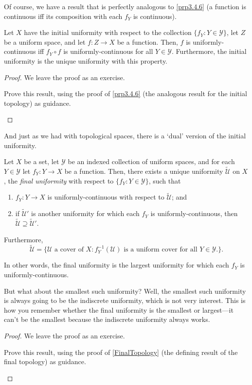 Of course, we have a result that is perfectly analogous to \cref{prp3.4.6} (a function is continuous iff its composition with each $f_Y$ is continuous).
\begin{prp}\label{prp4.2.54}
Let $X$ have the initial uniformity with respect to the collection $\{ f_Y:Y\in \mathcal{Y}\}$, let $Z$ be a uniform space, and let $f:Z\rightarrow X$ be a function.  Then, $f$ is uniformly-continuous iff $f_Y\circ f$ is uniformly-continuous for all $Y\in \mathcal{Y}$.  Furthermore, the initial uniformity is the unique uniformity with this property.
\begin{proof}
We leave the proof as an exercise.
\begin{exr}
Prove this result, using the proof of \cref{prp3.4.6} (the analogous result for the initial topology) as guidance.
\end{exr}
\end{proof}
\end{prp}
And just as we had with topological spaces, there is a `dual' version of the initial uniformity.
\begin{prp}\label{FinalUniformity}
Let $X$ be a set, let $\mathcal{Y}$ be an indexed collection of uniform spaces, and for each $Y\in \mathcal{Y}$ let $f_Y:Y\rightarrow X$ be a function.  Then, there exists a unique uniformity $\widetilde{\mathcal{U}}$ on $X$, the \emph{final uniformity} with respect to $\{ f_Y:Y\in \mathcal{Y}\}$, such that
\begin{enumerate}
\item $f_Y:Y\rightarrow X$ is uniformly-continuous with respect to $\widetilde{\mathcal{U}}$; and
\item if $\widetilde{\mathcal{U}}'$ is another uniformity for which each $f_Y$ is uniformly-continuous, then $\widetilde{\mathcal{U}}\supseteq \widetilde{\mathcal{U}}'$.
\end{enumerate}
Furthermore,
\begin{equation}
\widetilde{\mathcal{U}}=\{ \mathcal{U}\text{ a cover of }X:f_Y^{-1}(\mathcal{U})\text{ is a uniform cover for all }Y\in \mathcal{Y}\text{.}\} .
\end{equation}
\begin{rmk}
In other words, the final uniformity is the largest uniformity for which each $f_Y$ is uniformly-continuous.
\end{rmk}
\begin{rmk}
But what about the smallest such uniformity?  Well, the smallest such uniformity is always going to be the indiscrete uniformity, which is not very interest.  This is how you remember whether the final uniformity is the smallest or largest---it can't be the smallest because the indiscrete uniformity always works.
\end{rmk}
\begin{proof}
We leave the proof as an exercise.
\begin{exr}
Prove this result, using the proof of \cref{FinalTopology} (the defining result of the final topology) as guidance.
\end{exr}
\end{proof}
\end{prp}
